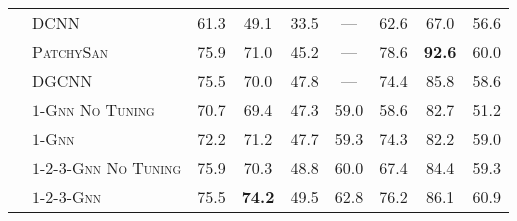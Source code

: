\documentclass[letterpaper]{article}
\theoremstyle{definition}
\begin{document}
\begin{table*}[t]
\begin{tabular}{@{}clccccccc@{}}
		\\
		\cmidrule{2-9}
		\multirow{7}{*}{\rotatebox{90}{GNN}}
		& \textsc{DCNN}                      & 61.3           & 49.1                & 33.5                  & ---                 & 62.6              & 67.0               & 56.6                \\
		& \textsc{PatchySan}                 & 75.9           & 71.0                & 45.2                  & ---                 & 78.6              & \textbf{92.6}      & 60.0                \\
		& \textsc{DGCNN}                     & 75.5           & 70.0                & 47.8                  & ---                 & 74.4              & 85.8               & 58.6                \\     
		\cmidrule{2-9}   
		
		& \textsc{$1$-Gnn No Tuning}         & 70.7           & 69.4                & 47.3                  & 59.0                & 58.6              & 82.7               & 51.2                \\
		& \textsc{$1$-Gnn}                   & 72.2           & 71.2                & 47.7                  & 59.3                & 74.3              & 82.2               & 59.0                \\
		& \textsc{$1$-$2$-$3$-Gnn No Tuning} & 75.9           & 70.3                & 48.8                  & 60.0                & 67.4              & 84.4               & 59.3                \\
		& \textsc{$1$-$2$-$3$-Gnn}           & 75.5           & \textbf{74.2}       & 49.5                  & 62.8                & 76.2              & 86.1               & 60.9                \\
\bottomrule
	\end{tabular}
\end{table*}
\end{document}
